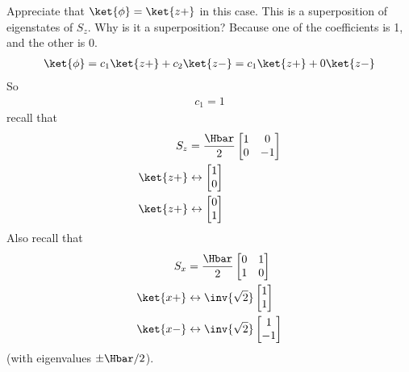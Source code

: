 {Appreciate that \(\ket{\phi} = \ket{z+}\) in this case.  This is a superposition of eigenstates of \(S_z\).  Why is it a superposition?  Because one of the coefficients is 1, and the other is 0.
%
\begin{equation}\label{eqn:PHY356Foct26:106}
\begin{aligned}
\ket{\phi}
=
 c_1 \ket{z+}
+ c_2 \ket{z-}
=
 c_1 \ket{z+}
+ 0 \ket{z-}
\end{aligned}
\end{equation}
%
So
\begin{equation}\label{eqn:PHY356Foct26:107}
\begin{aligned}
c_1 = 1
\end{aligned}
\end{equation}
%
recall that
\begin{equation}\label{eqn:PHY356Foct26:108}
\begin{aligned}
S_z &= \frac{\Hbar}{2}
\begin{bmatrix}
1 & 0 \\
0 & -1
\end{bmatrix} \\
\ket{z+} &\leftrightarrow
\begin{bmatrix}
1 \\
0
\end{bmatrix} \\
\ket{z+} &\leftrightarrow
\begin{bmatrix}
0 \\
1
\end{bmatrix}
\end{aligned}
\end{equation}
%
Also recall that
\begin{equation}\label{eqn:PHY356Foct26:109}
\begin{aligned}
S_x &= \frac{\Hbar}{2}
\begin{bmatrix}
0 & 1 \\
1 & 0
\end{bmatrix} \\
\ket{x+} &\leftrightarrow
\inv{\sqrt{2}}
\begin{bmatrix}
1 \\
1
\end{bmatrix} \\
\ket{x-} &\leftrightarrow
\inv{\sqrt{2}}
\begin{bmatrix}
1 \\
-1
\end{bmatrix}
\end{aligned}
\end{equation}
%
(with eigenvalues \(\pm\Hbar/2\)).

}

